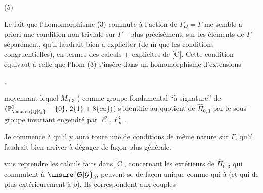 (5)\quad
{}

Le fait que l'homomorphisme
(3) commute à l'action de $\Gamma_Q=\Gamma$
me semble  a priori une condition
non triviale sur $\Gamma$ -- plus
précisément, sur les éléments de
$\Gamma$ séparément, qu'il faudrait bien
 à expliciter (de $\overline{\mathrm m}$ que les
conditions congruentielles), en
termes des calculs $\pm$ explicites
de [C]. Cette condition équivaut
à celle que l'hom (3) s'insère
dans un homomorphisme d'extensions



,

moyennant lequel $M_{0,3}$ ( comme groupe fondamental ``à signature'' de $(\mathbb P^1_{\unsure{\mathbb Q|Q}}-\{0\},\,2\{1\}+3\{\infty\})$) s'identifie au quotient de $\widehat{\Pi}_{0,3}$ par le sous-groupe invariant  engendré par $\ell_1^2,\ell_\infty^3$.

Je commence à  qu'il y aura toute une  de conditions de même nature sur $\Gamma$, qu'il faudrait bien arriver à dégager de façon plus générale.


 vais reprendre les calculs faits dans [C], concernant les  extérieurs de $\widehat{\Pi}_{0,3}$ qui commutent à $\unsure{\mathfrak S|\mathcal G}_3$,   peuvent se  de façon unique comme    qui  à  (et qui de plus  extérieurement à $\rho$). Ils correspondent  aux couples

